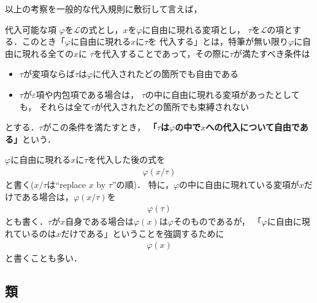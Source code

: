 	以上の考察を一般的な代入規則に敷衍して言えば，
	
	\begin{itembox}[l]{代入可能な項}
		$\varphi$を$\mathcal{L}$の式とし，$x$を$\varphi$に自由に現れる変項とし，
		$\tau$を$\mathcal{L}$の項とする．このとき「$\varphi$に自由に現れる$x$に$\tau$を
		代入する」とは，特筆が無い限り$\varphi$に自由に現れる全ての$x$に
		$\tau$を代入することであって，その際に$\tau$が満たすべき条件は
		\begin{itemize}
			\item $\tau$が変項ならば$\tau$は$\varphi$に代入されたどの箇所でも自由である
			\item $\tau$が$\varepsilon$項や内包項である場合は，
				$\tau$の中に自由に現れる変項があったとしても，
				それらは全て$\tau$が代入されたどの箇所でも束縛されない
		\end{itemize}
		とする．$\tau$がこの条件を満たすとき，
		{\bf 「$\tau$は$\varphi$の中で$x$への代入について自由である」}という．
	\end{itembox}
	
	$\varphi$に自由に現れる$x$に$\tau$を代入した後の式を
	\begin{align}
		\varphi(x/\tau)
	\end{align}
	と書く($x/\tau$は``replace $x$ by $\tau$''の順)．
	特に，$\varphi$の中に自由に現れている変項が$x$だけである場合は，$\varphi(x/\tau)$を
	\begin{align}
		\varphi(\tau)
	\end{align}
	とも書く．$\tau$が$x$自身である場合は$\varphi(x)$は$\varphi$そのものであるが，
	「$\varphi$に自由に現れているのは$x$だけである」ということを強調するために
	\begin{align}
		\varphi(x)
	\end{align}
	と書くことも多い．
	
\subsection{類}
	\begin{comment}
	\begin{screen}
		\begin{dfn}[閉項]
			どの変項も自由に現れない$\varepsilon$項を
			{\bf 閉${\boldsymbol \varepsilon}$項}\index{
			へいイプシロンこう@閉$\varepsilon$項}{\bf (closed epsilon term)}と呼び，
			どの変項も自由に現れない内包項を{\bf 閉内包項}\index{
			へいないほうこう@閉内包項}{\bf (closed comprehension term)}と呼ぶ．
			また閉$\varepsilon$項と閉内包項は以上のみである．
		\end{dfn}
	\end{screen}
	\end{comment}
	
